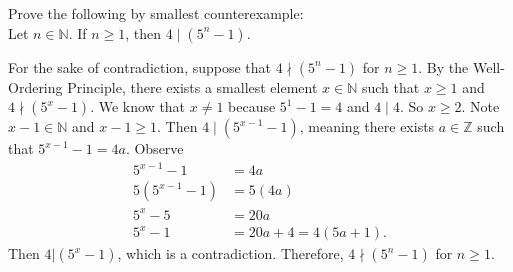 \documentclass{article}
\newcommand{\Z}{\mathbb{Z}}
\theoremstyle{definition}
\begin{document}
\begin{question}
    Prove the following by smallest counterexample:\\
    Let $n\in \mathbb{N}$. If $n\geq 1$, then $4 \mid (5^n-1)$.
\end{question}
\begin{solution}
      For the sake of contradiction, suppose that $4 \nmid (5^n-1)$ for $n\geq 1$. By the Well-Ordering Principle, there exists a smallest element $x\in \mathbb{N}$ such that $x\geq 1$ and $4 \nmid (5^x-1)$. We know that $x\neq 1$ because $5^1-1=4$ and $4\mid 4$. So $x\geq 2$. Note $x-1\in \mathbb{N}$ and $x-1\geq 1$. Then $4\mid (5^{x-1}-1)$, meaning there exists $a\in \Z$ such that $5^{x-1}-1 = 4a$. Observe
      \begin{align*}
      5^{x-1}-1 &= 4a\\
      5(5^{x-1}-1) &= 5(4a)\\
      5^x - 5 &= 20a\\
      5^x -1 &= 20a +4 = 4(5a+1).
      \end{align*}
      Then $4|(5^x-1)$, which is a contradiction. Therefore, $4 \nmid (5^n-1)$ for $n\geq 1$.
\end{solution}
\end{document}
